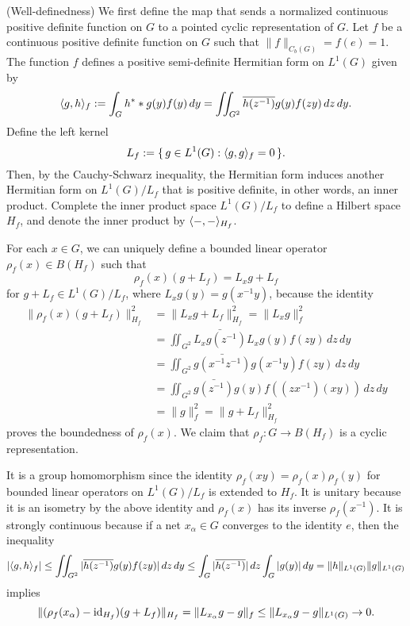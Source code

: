 \documentclass{../../small}
\begin{document}
\begin{pf}
(Well-definedness)
We first define the map that sends a normalized continuous positive definite function on $G$ to a pointed cyclic representation of $G$.
Let $f$ be a continuous positive definite function on $G$ such that $\|f\|_{C_b(G)}=f(e)=1$.
The function $f$ defines a positive semi-definite Hermitian form on $L^1(G)$ given by
\[\langle g,h\rangle_f:=\int_Gh^**g(y)f(y)\,dy=\iint_{G^2}\overline{h(z^{-1})}g(y)f(zy)\,dz\,dy.\]
Define the left kernel
\[L_f:=\{\,g\in L^1(G):\langle g,g\rangle_f=0\,\}.\]
Then, by the Cauchy-Schwarz inequality, the Hermitian form induces another Hermitian form on $L^1(G)/L_f$ that is positive definite, in other words, an inner product.
Complete the inner product space $L^1(G)/L_f$ to define a Hilbert space $H_f$, and denote the inner product by $\langle-,-\rangle_{H_f}$.

For each $x\in G$, we can uniquely define a bounded linear operator $\rho_f(x)\in B(H_f)$ such that
\[\rho_f(x)(g+L_f)=L_xg+L_f\]
for $g+L_f\in L^1(G)/L_f$, where $L_xg(y)=g(x^{-1}y)$, because the identity
\begin{align*}
\|\rho_f(x)(g+L_f)\|_{H_f}^2&=\|L_xg+L_f\|_{H_f}^2=\|L_xg\|_f^2\\
&=\iint_{G^2}\bar{L_xg(z^{-1})}L_xg(y)f(zy)\,dz\,dy\\
&=\iint_{G^2}\bar{g(x^{-1}z^{-1})}g(x^{-1}y)f(zy)\,dz\,dy\\
&=\iint_{G^2}\bar{g(z^{-1})}g(y)f((zx^{-1})(xy))\,dz\,dy\\
&=\|g\|_f^2=\|g+L_f\|_{H_f}^2
\end{align*}
proves the boundedness of $\rho_f(x)$.
We claim that $\rho_f:G\to B(H_f)$ is a cyclic representation.

It is a group homomorphism since the identity $\rho_f(xy)=\rho_f(x)\rho_f(y)$ for bounded linear operators on $L^1(G)/L_f$ is extended to $H_f$.
It is unitary because it is an isometry by the above identity and $\rho_f(x)$ has its inverse $\rho_f(x^{-1})$.
It is strongly continuous because if a net $x_\alpha\in G$ converges to the identity $e$, then the inequality
\[|\langle g,h\rangle_f|\le\iint_{G^2}|\overline{h(z^{-1})}g(y)f(zy)|\,dz\,dy\le\int_G|\overline{h(z^{-1})}|\,dz\int_G|g(y)|\,dy=\|h\|_{L^1(G)}\|g\|_{L^1(G)}\]
implies
\[\|(\rho_f(x_\alpha)-\operatorname{id}_{H_f})(g+L_f)\|_{H_f}=\|L_{x_\alpha}g-g\|_f\le\|L_{x_\alpha}g-g\|_{L^1(G)}\to0.\]


\end{pf}
\end{document}
